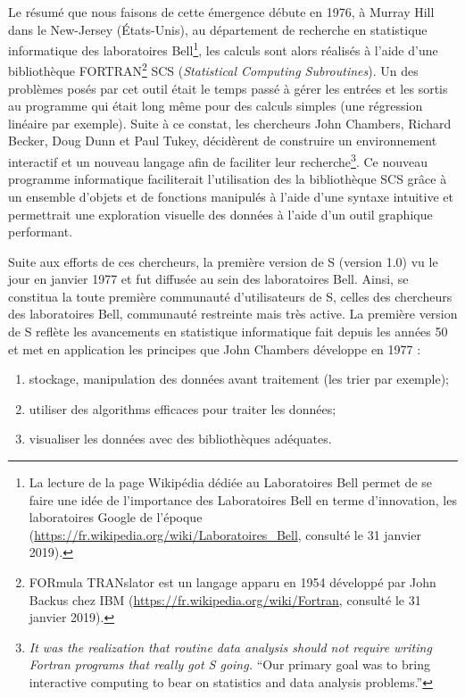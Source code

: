 \documentclass[]{article}
\providecommand{\tightlist}{%
  \setlength{\itemsep}{0pt}\setlength{\parskip}{0pt}}
\begin{document}
Le résumé que nous faisons de cette émergence débute en 1976, à Murray Hill dans
le New-Jersey (États-Unis), au département de recherche en statistique
informatique des laboratoires Bell\footnote{La lecture de la page Wikipédia dédiée au Laboratoires Bell permet de
  se faire une idée de l'importance des Laboratoires Bell en terme d'innovation,
  les laboratoires Google de l'époque (\url{https://fr.wikipedia.org/wiki/Laboratoires_Bell}, consulté le 31 janvier 2019).}, les calculs sont alors réalisés à
l'aide d'une bibliothèque FORTRAN\footnote{FORmula TRANslator est un langage apparu en 1954 développé par
  John Backus chez IBM (\url{https://fr.wikipedia.org/wiki/Fortran}, consulté le 31 janvier 2019).} SCS (\emph{Statistical Computing
Subroutines}). Un des problèmes posés par cet outil était le temps passé à gérer
les entrées et les sortis au programme qui était long même pour des calculs
simples (une régression linéaire par exemple). Suite à ce constat, les
chercheurs John Chambers, Richard Becker, Doug Dunn et Paul Tukey, décidèrent de
construire un environnement interactif et un nouveau langage afin de faciliter
leur recherche\footnote{\emph{It was the realization that routine data analysis should not require writing Fortran programs that really got S going.} \citep[ p.~2]{becker_s_1984} ``Our primary goal was to bring interactive computing to bear on statistics and data analysis problems.''}. Ce nouveau programme informatique faciliterait
l'utilisation des la bibliothèque SCS grâce à un ensemble d'objets et de
fonctions manipulés à l'aide d'une syntaxe intuitive et permettrait une
exploration visuelle des données à l'aide d'un outil graphique performant.

Suite aux efforts de ces chercheurs, la première version de S (version 1.0) vu le jour en janvier 1977 et fut diffusée au sein des laboratoires Bell. Ainsi, se
constitua la toute première communauté d'utilisateurs de S, celles des chercheurs des laboratoires Bell, communauté restreinte mais très active. La première version de S reflète les avancements en statistique informatique fait depuis les années 50 et met en application les principes que John Chambers développe en 1977 \citep{chambers_computational_1977} :

\begin{enumerate}
\def\labelenumi{\arabic{enumi}.}
\tightlist
\item
  stockage, manipulation des données avant traitement (les trier par exemple);
\item
  utiliser des algorithms efficaces pour traiter les données;
\item
  visualiser les données avec des bibliothèques adéquates.
\end{enumerate}
\end{document}
